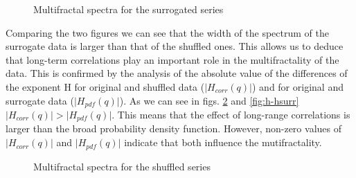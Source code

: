 \documentclass[onecolumn, preprint,aps,amsmath, amssymb, superscriptaddress]{revtex4}
\begin{document}
\begin{figure}
\caption{Multifractal spectra for the surrogated series}
\label{fig:spectrum_surrogate}
\end{figure}

Comparing the two figures we can see that the width of the spectrum of the surrogate data is larger than that of the shuffled ones. This allows us to deduce that long-term correlations play an important role in the multifractality of the data. This is confirmed by the analysis of the absolute value of the differences of the exponent H for original and shuffled data ($\lvert H_{corr}(q)\rvert$) and for original and surrogate data ($\lvert H_{pdf}(q)\rvert$). As we can see in figs. \ref{fig:h-hshuff} and \ref{fig:h-hsurr} $\lvert H_{corr}(q)\rvert > \lvert H_{pdf}(q)\rvert$. This means that the effect of long-range correlations is larger than the broad probability density function. However, non-zero values of $\lvert H_{corr}(q)\rvert$ and $\lvert H_{pdf}(q)\rvert$ indicate that both influence the mutifractality.


\begin{figure}
\caption{Multifractal spectra for the shuffled series}
\label{fig:h-hshuff}
\end{figure}
\end{document}

